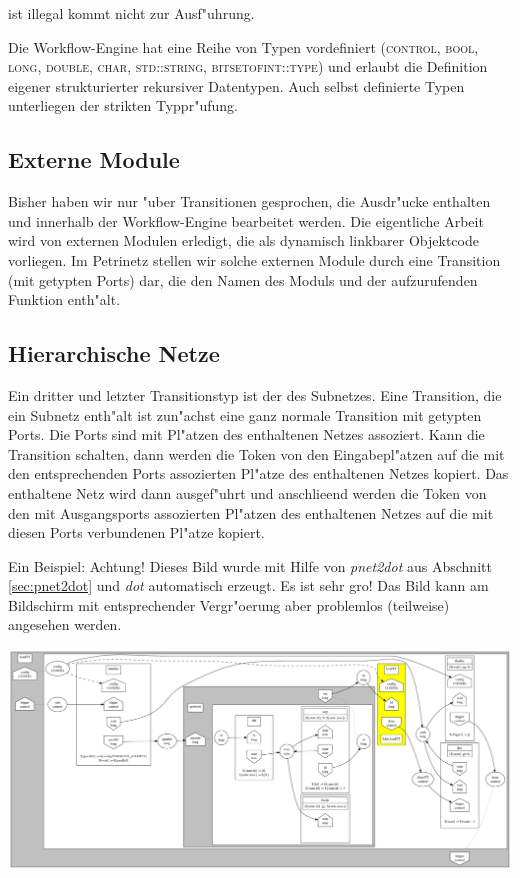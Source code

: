 \documentclass[a4paper,12pt]{article}
\newlength{\lw}\setlength{\lw}{1pt}
\newlength{\st}\setlength{\st}{0pt}
\newcommand{\type}[1]{\textsc{#1}}
\newcommand{\program}[1]{\textit{#1}}
\begin{document}
ist illegal kommt nicht zur Ausf"uhrung.

Die Workflow-Engine hat eine Reihe von Typen vordefiniert
(\type{control}, \type{bool}, \type{long}, \type{double},
\type{char}, \type{std::string}, \type{bitsetofint::type}) und
erlaubt die Definition eigener strukturierter rekursiver
Datentypen. Auch selbst definierte Typen unterliegen der strikten
Typpr"ufung.

\subsection{Externe Module}

Bisher haben wir nur "uber Transitionen gesprochen, die Ausdr"ucke
enthalten und innerhalb der Workflow-Engine bearbeitet werden. Die
eigentliche Arbeit wird von externen Modulen erledigt, die als
dynamisch linkbarer Objektcode vorliegen. Im Petrinetz stellen wir
solche externen Module durch eine Transition (mit getypten Ports) dar,
die den Namen des Moduls und der aufzurufenden Funktion enth"alt.

\subsection{Hierarchische Netze}\label{sec:hierarchy}

Ein dritter und letzter Transitionstyp ist der des Subnetzes. Eine
Transition, die ein Subnetz enth"alt ist zun"achst eine ganz normale
Transition mit getypten Ports. Die Ports sind mit Pl"atzen des
enthaltenen Netzes assoziert. Kann die Transition schalten, dann
werden die Token von den Eingabepl"atzen auf die mit den
entsprechenden Ports assozierten Pl"atze des enthaltenen Netzes
kopiert. Das enthaltene Netz wird dann ausgef"uhrt und anschlie\3end
werden die Token von den mit Ausgangsports assozierten Pl"atzen des
enthaltenen Netzes auf die mit diesen Ports verbundenen Pl"atze
kopiert.

Ein Beispiel: Achtung! Dieses Bild wurde mit Hilfe von
\program{pnet2dot} aus Abschnitt \ref{sec:pnet2dot} und \program{dot}
automatisch erzeugt. Es ist sehr gro\3! Das Bild kann am Bildschirm
mit entsprechender Vergr"o\3erung aber problemlos (teilweise)
angesehen werden.

\begin{center}
\includegraphics[width=\textwidth]{loadTT.pdf}
\end{center}
\end{document}
